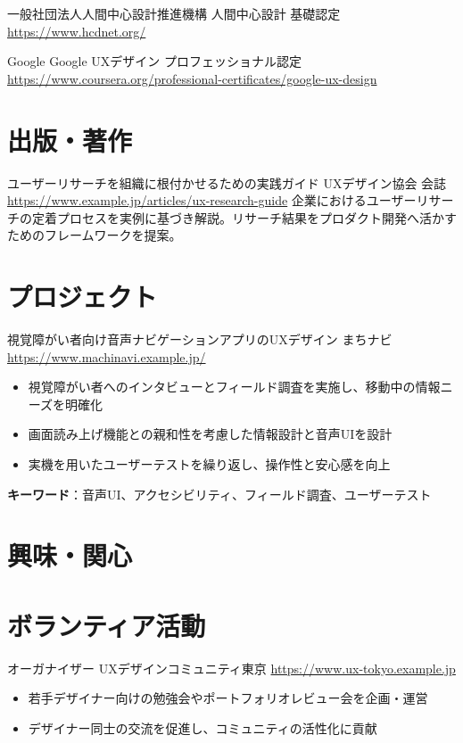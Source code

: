 \documentclass[a4paper, serif, 10pt]{moderncv}
\begin{document}
        {一般社団法人人間中心設計推進機構}
        {人間中心設計 基礎認定}
        {\url{https://www.hcdnet.org/}}
        {}
        {}

        {Google}
        {Google UXデザイン プロフェッショナル認定}
        {\url{https://www.coursera.org/professional-certificates/google-ux-design}}
        {}
        {}
\section{出版・著作}

        {ユーザーリサーチを組織に根付かせるための実践ガイド}
        {UXデザイン協会 会誌}
        {\url{https://www.example.jp/articles/ux-research-guide}}
        {}
        {企業におけるユーザーリサーチの定着プロセスを実例に基づき解説。リサーチ結果をプロダクト開発へ活かすためのフレームワークを提案。}
\section{プロジェクト}

        {視覚障がい者向け音声ナビゲーションアプリのUXデザイン}
        {まちナビ}
        {\url{https://www.machinavi.example.jp/}}
        {}
        {\begin{itemize}
\item 視覚障がい者へのインタビューとフィールド調査を実施し、移動中の情報ニーズを明確化
\item 画面読み上げ機能との親和性を考慮した情報設計と音声UIを設計
\item 実機を用いたユーザーテストを繰り返し、操作性と安心感を向上
\end{itemize}
\textbf{キーワード}：音声UI、アクセシビリティ、フィールド調査、ユーザーテスト}
\section{興味・関心}

\section{ボランティア活動}

        {オーガナイザー}
        {UXデザインコミュニティ東京}
        {\url{https://www.ux-tokyo.example.jp}}
        {}
        {\begin{itemize}
\item 若手デザイナー向けの勉強会やポートフォリオレビュー会を企画・運営
\item デザイナー同士の交流を促進し、コミュニティの活性化に貢献
\end{itemize}}
    
\end{document}
